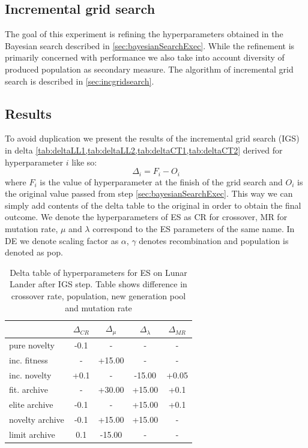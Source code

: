\subsection{Incremental grid search}
\label{sec:igs}
The goal of this experiment is refining the hyperparameters obtained in the Bayesian search described in \cref{sec:bayesianSearchExec}. While the refinement is primarily concerned with performance we also take into account diversity of produced population as secondary measure.
The algorithm of incremental grid search is described in \cref{sec:incgridsearch}. 

\subsection{Results}
To avoid duplication we present the results of the incremental grid search (IGS) in delta \cref{tab:deltaLL1,tab:deltaLL2,tab:deltaCT1,tab:deltaCT2} derived for hyperparameter $i$ like so:
$$\Delta_i = F_i - O_i$$
where $F_i$ is the value of hyperparameter at the finish of the grid search and $O_i$ is the original value passed from step \ref{sec:bayesianSearchExec}. This way we  can simply add contents of the delta table to the original in order to obtain the final outcome.
We denote the hyperparameters of ES as CR for crossover, MR for mutation rate, $\mu$ and $\lambda$ correspond to the ES parameters of the same name. In DE we denote scaling factor as $\alpha$, $\gamma$ denotes recombination and population is denoted as pop.  


\begin{table}[ht]
	\centering
	\scriptsize
	\setlength{\tabcolsep}{4pt}
	\renewcommand{\arraystretch}{1.15}
	\begin{tabular}{lcccc}
		\toprule
		{} &   $\Delta_{CR}$ &   $\Delta_{\mu}$ & $\Delta_{\lambda}$ &    $\Delta_{MR}$ \\
		\midrule
		pure novelty    & -0.1 &       - &         - &     - \\
		inc. fitness    &    - &   +15.00 &         - &     - \\
		inc. novelty    &  +0.1 &       - &    -15.00 &  +0.05 \\
		fit. archive    &    - &   +30.00 &     +15.00 &   +0.1 \\
		elite archive   & -0.1 &       - &     +15.00 &   +0.1 \\
		novelty archive & -0.1 &   +15.00 &     +15.00 &     - \\
		limit archive   &  0.1 &  -15.00 &         - &     - \\
		\bottomrule
	\end{tabular}
	\caption{Delta table of hyperparameters for ES on Lunar Lander  after IGS step. Table shows difference in crossover rate, population, new generation pool and mutation rate}
	\label{tab:deltaLL1}
\end{table}


